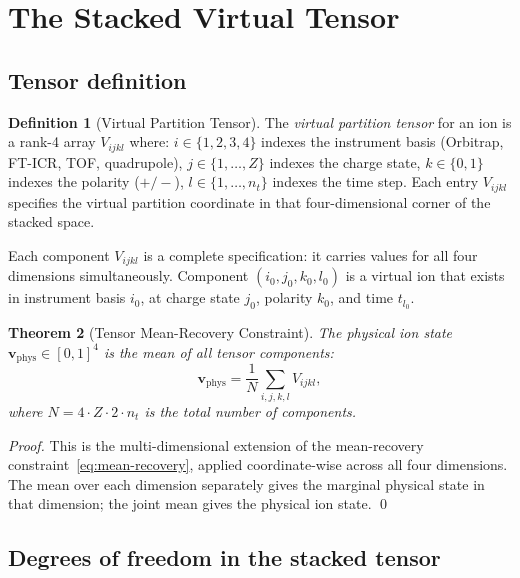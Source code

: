 \documentclass[twocolumn,10pt,a4paper]{article}
\theoremstyle{thmstyle}
\newtheorem{theorem}{Theorem}[section]
\theoremstyle{definition}
\newtheorem{definition}[theorem]{Definition}
\theoremstyle{remark}
\begin{document}
\section{The Stacked Virtual Tensor}
\label{sec:tensor}

\subsection{Tensor definition}

\begin{definition}[Virtual Partition Tensor]
\label{def:tensor}
The \emph{virtual partition tensor} for an ion is a rank-4 array
$V_{ijkl}$ where:
$i \in \{1,2,3,4\}$ indexes the instrument basis
(Orbitrap, FT-ICR, TOF, quadrupole),
$j \in \{1,\ldots,Z\}$ indexes the charge state,
$k \in \{0,1\}$ indexes the polarity ($+/-$),
$l \in \{1,\ldots,n_t\}$ indexes the time step.
Each entry $V_{ijkl}$ specifies the virtual partition coordinate in that
four-dimensional corner of the stacked space.
\end{definition}

Each component $V_{ijkl}$ is a complete specification: it carries values
for all four dimensions simultaneously. Component $(i_0, j_0, k_0, l_0)$
is a virtual ion that exists in instrument basis $i_0$, at charge state
$j_0$, polarity $k_0$, and time $t_{l_0}$.

\begin{theorem}[Tensor Mean-Recovery Constraint]
\label{thm:tensor-constraint}
The physical ion state $\mathbf{v}_{\text{phys}} \in [0,1]^4$ is the
mean of all tensor components:
\begin{equation}
\mathbf{v}_{\text{phys}} = \frac{1}{N}\sum_{i,j,k,l} V_{ijkl},
\label{eq:tensor-mean}
\end{equation}
where $N = 4 \cdot Z \cdot 2 \cdot n_t$ is the total number of components.
\end{theorem}

\begin{proof}
This is the multi-dimensional extension of the mean-recovery
constraint~\eqref{eq:mean-recovery}, applied coordinate-wise across all
four dimensions. The mean over each dimension separately gives the
marginal physical state in that dimension; the joint mean gives the
physical ion state. \qed
\end{proof}

\subsection{Degrees of freedom in the stacked tensor}
\end{document}
